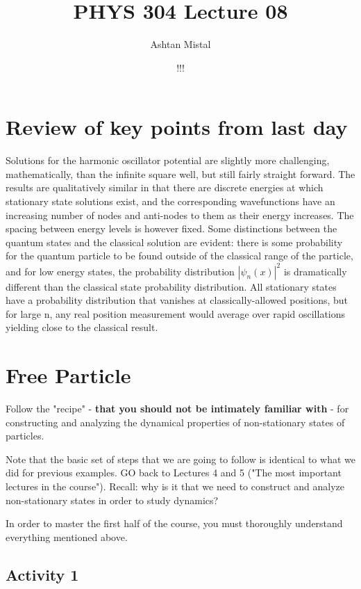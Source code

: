 \documentclass{article}
\title{PHYS 304 Lecture 08}
\author{Ashtan Mistal}
\date{!!!}
\begin{document}
\ifstandalone
\maketitle
\fi

\graphicspath{{./Lecture08/}}

\section{Review of key points from last day}

Solutions for the harmonic oscillator potential are slightly more challenging, mathematically, than the infinite square well, but still fairly straight forward. The results are qualitatively similar in that there are discrete energies at which stationary state solutions exist, and the corresponding wavefunctions have an increasing number of nodes and anti-nodes to them as their energy increases. The spacing between energy levels is however fixed. Some distinctions between the quantum states and the classical solution are evident: there is some probability for the quantum particle to be found outside of the classical range of the particle, and for low energy states, the probability distribution $|\psi_n(x)|^2$ is dramatically different than the classical state probability distribution.  All stationary states have a probability distribution that vanishes at classically-allowed positions, but for large n, any real position measurement would average over rapid oscillations yielding close to the classical result.

\section{Free Particle}

Follow the "recipe" - \textbf{that you should not be intimately familiar with} - for constructing and analyzing the dynamical properties of non-stationary states of particles. 

Note that the basic set of steps that we are going to follow is identical to what we did for previous examples. GO back to Lectures 4 and 5 ("The most important lectures in the course"). Recall: why is it that we need to construct and analyze non-stationary states in order to study dynamics?

In order to master the first half of the course, you must thoroughly understand everything mentioned above. 

\subsection{Activity 1}
\end{document}
